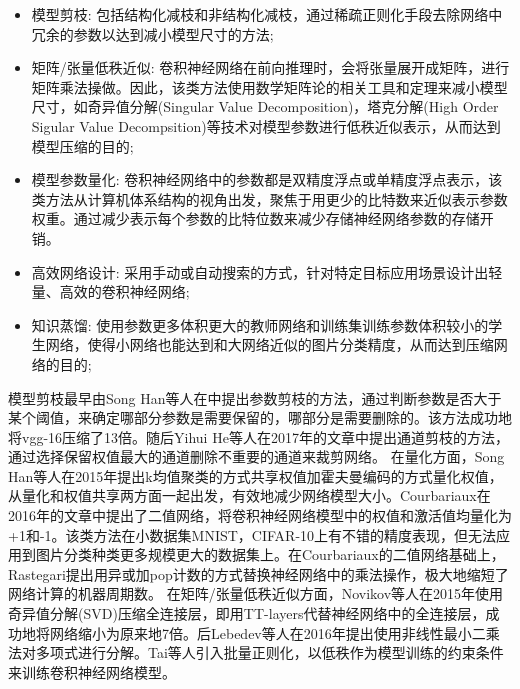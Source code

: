 \begin{itemize}
    \item 模型剪枝: 包括结构化减枝和非结构化减枝，通过稀疏正则化手段去除网络中冗余的参数以达到减小模型尺寸的方法;
    \item 矩阵/张量低秩近似: 卷积神经网络在前向推理时，会将张量展开成矩阵，进行矩阵乘法操做。因此，该类方法使用数学矩阵论的相关工具和定理来减小模型尺寸，如奇异值分解(Singular Value Decomposition)，塔克分解(High Order Sigular Value Decompsition)等技术对模型参数进行低秩近似表示，从而达到模型压缩的目的;
    \item 模型参数量化: 卷积神经网络中的参数都是双精度浮点或单精度浮点表示，该类方法从计算机体系结构的视角出发，聚焦于用更少的比特数来近似表示参数权重。通过减少表示每个参数的比特位数来减少存储神经网络参数的存储开销。
    \item 高效网络设计: 采用手动或自动搜索的方式，针对特定目标应用场景设计出轻量、高效的卷积神经网络;
    \item 知识蒸馏: 使用参数更多体积更大的教师网络和训练集训练参数体积较小的学生网络，使得小网络也能达到和大网络近似的图片分类精度，从而达到压缩网络的目的;
\end{itemize}
模型剪枝最早由Song Han等人在\cite{han2015learning}中提出参数剪枝的方法，通过判断参数是否大于某个阈值，来确定哪部分参数是需要保留的，哪部分是需要删除的。该方法成功地将vgg-16压缩了13倍。随后Yihui He等人在2017年的文章中\cite{he2017channel}提出通道剪枝的方法，通过选择保留权值最大的通道删除不重要的通道来裁剪网络。
在量化方面，Song Han等人在2015年\cite{han2015deep}提出k均值聚类的方式共享权值加霍夫曼编码的方式量化权值，从量化和权值共享两方面一起出发，有效地减少网络模型大小。Courbariaux在2016年的文章中\cite{courbariaux2016binarized}提出了二值网络，将卷积神经网络模型中的权值和激活值均量化为+1和-1。该类方法在小数据集MNIST，CIFAR-10上有不错的精度表现，但无法应用到图片分类种类更多规模更大的数据集上。在Courbariaux的二值网络基础上，Rastegari提出\cite{rastegari2016xnor}用异或加pop计数的方式替换神经网络中的乘法操作，极大地缩短了网络计算的机器周期数。
在矩阵/张量低秩近似方面，Novikov等人在2015年使用奇异值分解(SVD)\cite{novikov2015tensorizing}压缩全连接层，即用TT-layers代替神经网络中的全连接层，成功地将网络缩小为原来地7倍。后Lebedev等人在2016年\cite{lebedev2016fast}提出使用非线性最小二乘法对多项式进行分解。Tai等人\cite{tai2015convolutional}引入批量正则化，以低秩作为模型训练的约束条件来训练卷积神经网络模型。
